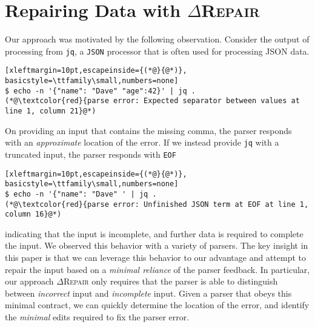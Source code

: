 \documentclass[acmsmall,screen,review,anonymous]{acmart}
\newcommand{\approach}{\textsc{$\Delta$Repair}\xspace}
\newcommand{\drepair}{\approach}
\def\<#1>{\texttt{#1}}
\begin{document}
\section{Repairing Data with \drepair}
\label{sec:drepair}
Our approach was motivated by the following observation.
Consider the output of processing
from \<jq>, a \<JSON> processor that is often used for processing JSON data.
\begin{lstlisting}[xleftmargin=10pt,escapeinside={(*@}{@*)}, basicstyle=\ttfamily\small,numbers=none]
$ echo -n '{"name": "Dave" "age":42}' | jq .
(*@\textcolor{red}{parse error: Expected separator between values at line 1, column 21}@*)
\end{lstlisting}
On providing an input that contains the missing comma, the parser responds with an
\emph{approximate} location of the error.
If we instead provide \<jq> with a truncated input,
the parser responds with \<EOF> 
\begin{lstlisting}[xleftmargin=10pt,escapeinside={(*@}{@*)}, basicstyle=\ttfamily\small,numbers=none]
$ echo -n '{"name": "Dave" ' | jq .
(*@\textcolor{red}{parse error: Unfinished JSON term at EOF at line 1, column 16}@*)
\end{lstlisting}
indicating that the
input is incomplete,
and further data is required to complete the input. We observed this behavior with a variety of
parsers.
The key insight in this paper is that we can leverage this behavior to our advantage and
attempt to repair the input based on a \emph{minimal reliance} of the parser feedback.
In particular, our approach \drepair only requires that the parser is able to distinguish
between \emph{incorrect} input and \emph{incomplete} input. Given a parser that obeys this
minimal contract, we can quickly determine the location of the error, and identify the
\emph{minimal} edits required to fix the parser error.
\end{document}
